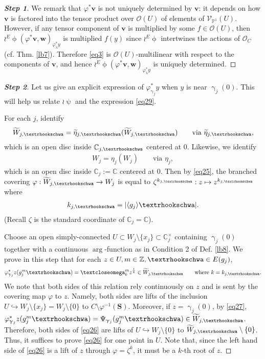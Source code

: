 \documentclass[12pt,a4paper,notitlepage]{article}
\theoremstyle{definition}
\theoremstyle{plain}
\newcommand{\wtd}{\widetilde}
\newcommand{\bk}[1]{\langle {#1}\rangle}
\newcommand{\scr}{\mathscr}
\newcommand{\Cbb}{\mathbb C}
\newcommand{\Zbb}{\mathbb Z}
\newcommand{\Pbb}{\mathbb P}
\newcommand{\Sbf}{\mathbf{S}}
\newcommand{\vbf}{\mathbf v}
\newcommand{\wbf}{\mathbf w}
\newcommand{\tipaomega}{\text{\textcloseomega}}
\newcommand{\tipae}{\text{\textrhookschwa}}
\numberwithin{equation}{subsection}
\begin{document}
\begin{proof}[\textbf{Step 1}]
We remark that $\varphi^*\vbf$ is not uniquely determined by $\vbf$: it depends  on how $\vbf$ is factored into the tensor product over $\scr O(U)$ of elements of $\scr V_{\Pbb^1}(U)$. However, if any tensor component of $\vbf$ is multiplied by some $f\in\scr O(U)$, then $\wr^E\upphi(\varphi^*\vbf,\wbf)_{\varphi_\uplambda^*y}$ is multiplied $f(y)$ since $\wr^E\upphi$ intertwines the actions of $\scr O_C$ (cf. Thm. \ref{lb7}). Therefore \eqref{eq3} is $\scr O(U)$-multilinear with respect to the   components of $\vbf$, and hence $\wr^E\upphi(\varphi^*\vbf,\wbf)_{\varphi_\uplambda^*y}$  is uniquely determined.
\end{proof}


\begin{proof}[\textbf{Step 2}] Let us give an explicit expression of $\varphi^*_{\upgamma_j}y$ when $y$ is near $\upgamma_j(0)$. This will help us relate $\wr\uppsi$ and the expression \eqref{eq29}. 

For each $j$, identify 
\begin{align*}
\wtd W_{j,\tipae}=\wtd\eta_{j,\tipae}(\wtd W_{j,\tipae})\qquad\text{via }	\wtd\eta_{j,\tipae},
\end{align*}
which is an open disc inside $\Cbb_{j,\tipae}$ centered at $0$. Likewise, we identify 
\begin{align*}
W_j=\eta_j(W_j) \qquad\text{via }\eta_j,	
\end{align*}
which is an open disc inside $\Cbb_j:=\Cbb$ centered at $0$. Then by \eqref{eq25}, the branched covering $\varphi:\wtd W_{j,\tipae}\rightarrow W_j$ is equal to $\zeta^{k_{j,\tipae}}:z\mapsto z^{k_{j,\tipae}}$ where
\begin{align*}
k_{j,\tipae}=|\bk{g_j}\tipae|.	
\end{align*}
(Recall $\zeta$ is the standard coordinate of $\Cbb_j=\Cbb$).

Choose an open simply-connected $U\subset W_j\setminus\{x_j\}\subset\Cbb_j^\times$ containing $\upgamma_j(0)$ together with a continuous $\arg$-function as in Condition 2 of Def. \ref{lb8}. We prove in this step that for each $z\in U,m\in\Zbb,\tipae\in E(g_j)$,
\begin{align}
\varphi^*_{\upgamma_j}z(g_j^m\tipae)=\tipaomega_k^mz^{\frac 1{k}}\in\wtd W_{j,\tipae}\qquad\text{where }k=k_{j,\tipae}.\label{eq26}
\end{align}	
We note that both sides of this relation rely continuously on $z$ and is sent by the covering map $\varphi$ to $z$. Namely, both sides are lifts of the inclusion $U\hookrightarrow W_j\setminus\{x_j\}=W_j\setminus\{0\}$ to  $C\setminus\varphi^{-1}(\Sbf)$. Moreover, if $z=\upgamma_j(0)$, by \eqref{eq27}, $\varphi^*_{\upgamma_j}z(g_j^m\tipae)=\Psi_{\upgamma_j}(g_j^m\tipae)\in\wtd W_{j,\tipae}$. Therefore, both sides of \eqref{eq26} are lifts of $U\hookrightarrow W_j\setminus\{0\}$ to $\wtd W_{j,\tipae}\setminus \{0\}$. Thus, it suffices to prove \eqref{eq26} for one point in $U$.  Note that, since the left hand side of \eqref{eq26} is a lift of $z$ through $\varphi=\zeta^k$, it must be a $k$-th root of $z$. 


\end{proof}
\end{document}
